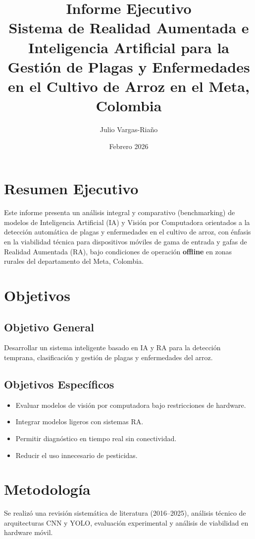 \documentclass[12pt]{article}
\title{Informe Ejecutivo\\
\large Sistema de Realidad Aumentada e Inteligencia Artificial para la Gestión de Plagas y Enfermedades en el Cultivo de Arroz en el Meta, Colombia}
\author{Julio Vargas-Riaño}
\date{Febrero 2026}
\begin{document}
\maketitle
\tableofcontents
\newpage

\section{Resumen Ejecutivo}
Este informe presenta un análisis integral y comparativo (benchmarking) de modelos de Inteligencia Artificial (IA) y Visión por Computadora orientados a la detección automática de plagas y enfermedades en el cultivo de arroz, con énfasis en la viabilidad técnica para dispositivos móviles de gama de entrada y gafas de Realidad Aumentada (RA), bajo condiciones de operación \textbf{offline} en zonas rurales del departamento del Meta, Colombia.

\section{Objetivos}

\subsection{Objetivo General}
Desarrollar un sistema inteligente basado en IA y RA para la detección temprana, clasificación y gestión de plagas y enfermedades del arroz.

\subsection{Objetivos Específicos}
\begin{itemize}
\item Evaluar modelos de visión por computadora bajo restricciones de hardware.
\item Integrar modelos ligeros con sistemas RA.
\item Permitir diagnóstico en tiempo real sin conectividad.
\item Reducir el uso innecesario de pesticidas.
\end{itemize}

\section{Metodología}
Se realizó una revisión sistemática de literatura (2016–2025), análisis técnico de arquitecturas CNN y YOLO, evaluación experimental y análisis de viabilidad en hardware móvil.
\end{document}
